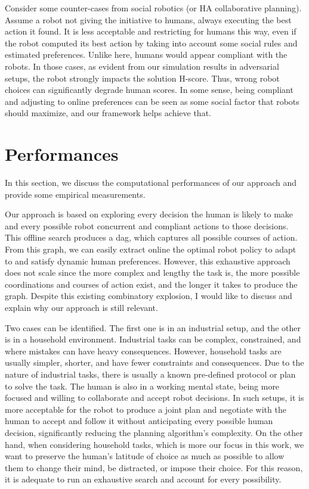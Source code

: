 Consider some counter-cases from social robotics (or HA collaborative planning). Assume a robot not giving the initiative to humans, always executing the best action it found. 
It is less acceptable and restricting for humans this way, even if the robot computed its best action by taking into account some social rules and estimated preferences. 
Unlike here, humans would appear compliant with the robots. 
In those cases, as evident from our simulation results in adversarial setups, the robot strongly impacts the solution H-score. Thus, wrong robot choices can significantly degrade human scores. In some sense, being compliant and adjusting to online preferences can be seen as some social factor that robots should maximize, and our framework helps achieve that.

\section{Performances}


In this section, we discuss the computational performances of our approach and provide some empirical measurements. 

Our approach is based on exploring every decision the human is likely to make and every possible robot concurrent and compliant actions to those decisions. 
This offline search produces a \acrfull{dag}, which captures all possible courses of action. From this graph, we can easily extract online the optimal robot policy to adapt to and satisfy dynamic human preferences. However, this exhaustive approach does not scale since the more complex and lengthy the task is, the more possible coordinations and courses of action exist, and the longer it takes to produce the graph. Despite this existing combinatory explosion, I would like to discuss and explain why our approach is still relevant.

Two cases can be identified. The first one is in an industrial setup, and the other is in a household environment. Industrial tasks can be complex, constrained, and where mistakes can have heavy consequences. However, household tasks are usually simpler, shorter, and have fewer constraints and consequences. Due to the nature of industrial tasks, there is usually a known pre-defined protocol or plan to solve the task. The human is also in a working mental state, being more focused and willing to collaborate and accept robot decisions. In such setups, it is more acceptable for the robot to produce a joint plan and negotiate with the human to accept and follow it without anticipating every possible human decision, significantly reducing the planning algorithm's complexity.
On the other hand, when considering household tasks, which is more our focus in this work, we want to preserve the human's latitude of choice as much as possible to allow them to change their mind, be distracted, or impose their choice. For this reason, it is adequate to run an exhaustive search and account for every possibility. 

